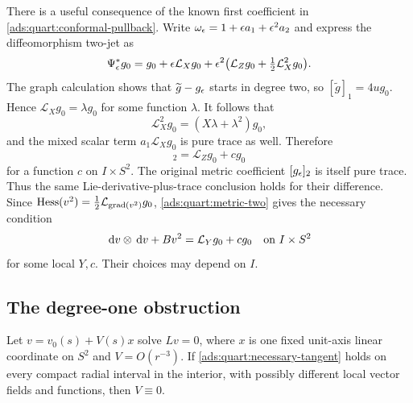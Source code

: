 There is a useful consequence of the known first coefficient in
\eqref{ads:quart:conformal-pullback}.  Write
\(\omega_\epsilon=1+\epsilon a_1+\epsilon^2a_2\) and express the
diffeomorphism two-jet as
\[
 \Psi_\epsilon^*g_0
  =g_0+\epsilon\mathcal L_Xg_0
      +\epsilon^2\bigl(\mathcal L_Zg_0
                      +\tfrac12\mathcal L_X^2g_0\bigr).
\]
The graph calculation shows that \(\widetilde g-g_\epsilon\) starts
in degree two, so \([\widetilde g]_1=4ug_0\).  Hence
\(\mathcal L_Xg_0=\lambda g_0\) for some function \(\lambda\).
It follows that
\[
 \mathcal L_X^2g_0=(X\lambda+\lambda^2)g_0,
\]
and the mixed scalar term \(a_1\mathcal L_Xg_0\) is pure trace as
well.  Therefore
\begin{equation}
 [\widetilde g]_2=\mathcal L_Zg_0+c g_0
 \label{ads:quart:second-tangent}
\end{equation}
for a function \(c\) on \(I\times S^2\).  The original metric
coefficient \([g_\epsilon]_2\) is itself pure trace.  Thus the same
Lie-derivative-plus-trace conclusion holds for their difference.
Since \(\operatorname{Hess}(v^2)=\frac12\mathcal L_{\operatorname{grad}(v^2)}g_0\),
\eqref{ads:quart:metric-two} gives the necessary condition
\begin{equation}
 \,\mathrm d v\otimes\,\mathrm d v+Bv^2=\mathcal L_Yg_0+c g_0
 \quad\hbox{on }I\times S^2
 \label{ads:quart:necessary-tangent}
\end{equation}
for some local \(Y,c\).  Their choices may depend on \(I\).

\subsection{The degree-one obstruction}\label{ads:quart:obstruction-section}

\begin{lemma}
\label{ads:lem:dipole-obstruction}
Let \(v=v_0(s)+V(s)x\) solve \(Lv=0\), where \(x\) is one fixed
unit-axis linear coordinate on \(S^2\) and \(V=O(r^{-3})\).
If \eqref{ads:quart:necessary-tangent} holds on every compact radial
interval in the interior, with possibly different local vector fields
and functions, then \(V\equiv0\).
\end{lemma}

